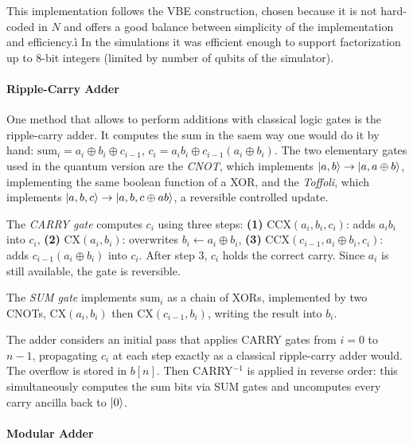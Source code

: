 \documentclass[11pt,a4paper]{article}
\begin{document}
This implementation follows the VBE construction, chosen because it is not hard-coded in $N$ and offers a good balance between simplicity of the implementation and efficiency.ì
In the simulations it was efficient enough to support factorization up to 8-bit integers (limited by number of qubits of the simulator).


\paragraph{Ripple-Carry Adder}
One method that allows to perform additions with classical logic gates is the ripple-carry adder.
It computes the sum in the saem way one would do it by hand: $\text{sum}_i = a_i \oplus b_i \oplus c_{i-1}$, 
 $c_i = a_i b_i \oplus c_{i-1}(a_i \oplus b_i)$. The two elementary gates used in the quantum version are the \textit{CNOT}, which implements $\ket{a,b} \to
\ket{a, a \oplus b}$, implementing the same boolean function of a XOR, and the \textit{Toffoli},
which implements $\ket{a,b,c} \to \ket{a, b, c \oplus ab}$,
a reversible controlled update.


The \textit{CARRY gate} computes $c_i$
using three steps: \textbf{(1)} $\mathrm{CCX}(a_i, b_i, c_i)$: adds $a_i b_i$ into $c_i$,
\textbf{(2)} $\mathrm{CX}(a_i, b_i)$: overwrites $b_i \leftarrow a_i \oplus b_i$,
\textbf{(3)} $\mathrm{CCX}(c_{i-1}, a_i \oplus b_i, c_i)$: adds $c_{i-1}(a_i \oplus b_i)$ into $c_i$.
After step 3, $c_i$ holds the correct carry. Since $a_i$ is still available,
 the gate is reversible.

The \textit{SUM gate} implements $\text{sum}_i$ as a chain of
XORs, implemented by two CNOTs,
$\mathrm{CX}(a_i, b_i)$ then $\mathrm{CX}(c_{i-1}, b_i)$,
writing the result into $b_i$.

The adder considers an initial pass that
applies CARRY gates from $i=0$ to $n-1$, propagating $c_i$ at each step exactly
as a classical ripple-carry adder would. The overflow is stored in $b[n]$. Then CARRY$^{-1}$ is applied in reverse order: this simultaneously
computes the sum bits via SUM gates and uncomputes every carry ancilla back to $\ket{0}$.


\paragraph{Modular Adder}
\end{document}
